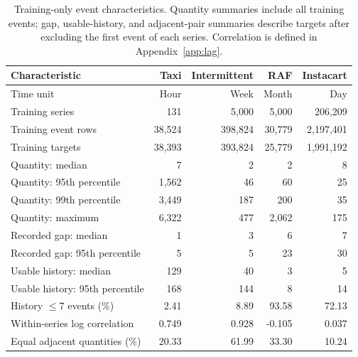 \documentclass[runningheads]{llncs}
\begin{document}
\begin{table}[htbp]
\caption{Training-only event characteristics. Quantity summaries include all
training events; gap, usable-history, and adjacent-pair summaries describe
targets after excluding the first event of each series. Correlation is
defined in Appendix~\ref{app:lag}.}
\label{tab:train-characteristics}
\centering\small
\setlength{\tabcolsep}{4pt}
\begin{tabular}{@{}lrrrr@{}}
\toprule
Characteristic & Taxi & Intermittent & RAF & Instacart\\
\midrule
Time unit & Hour & Week & Month & Day\\
Training series & 131 & 5,000 & 5,000 & 206,209\\
Training event rows & 38,524 & 398,824 & 30,779 & 2,197,401\\
Training targets & 38,393 & 393,824 & 25,779 & 1,991,192\\
Quantity: median & 7 & 2 & 2 & 8\\
Quantity: 95th percentile & 1,562 & 46 & 60 & 25\\
Quantity: 99th percentile & 3,449 & 187 & 200 & 35\\
Quantity: maximum & 6,322 & 477 & 2,062 & 175\\
Recorded gap: median & 1 & 3 & 6 & 7\\
Recorded gap: 95th percentile & 5 & 5 & 23 & 30\\
Usable history: median & 129 & 40 & 3 & 5\\
Usable history: 95th percentile & 168 & 144 & 8 & 14\\
History $\leq7$ events (\%) & 2.41 & 8.89 & 93.58 & 72.13\\
Within-series log correlation & 0.749 & 0.928 & -0.105 & 0.037\\
Equal adjacent quantities (\%) & 20.33 & 61.99 & 33.30 & 10.24\\
\bottomrule
\end{tabular}
\end{table}
\end{document}
